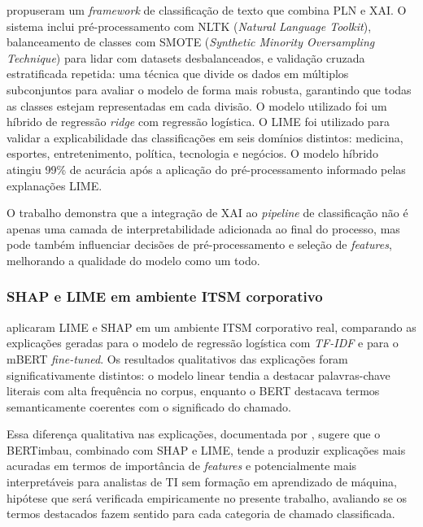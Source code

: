 \documentclass[
    12pt,                %
    openright,           %
    oneside,             %
    a4paper,             %
    english,             %
    brazil               %
]{abntex2}
\begin{document}
 propuseram um \textit{framework} de 
classificação de texto que combina PLN e XAI. O sistema inclui 
pré-processamento com NLTK (\textit{Natural Language Toolkit}), 
balanceamento de classes com SMOTE (\textit{Synthetic Minority 
Oversampling Technique}) para lidar com datasets desbalanceados, 
e validação cruzada estratificada repetida: uma técnica que divide 
os dados em múltiplos subconjuntos para avaliar o modelo de forma 
mais robusta, garantindo que todas as classes estejam representadas 
em cada divisão. O modelo utilizado foi um híbrido de regressão 
\textit{ridge} com regressão logística. O LIME foi utilizado para 
validar a explicabilidade das classificações em seis domínios 
distintos: medicina, esportes, entretenimento, política, tecnologia 
e negócios. O modelo híbrido atingiu 99\% de acurácia após a 
aplicação do pré-processamento informado pelas explanações LIME.

O trabalho demonstra que a integração de XAI ao \textit{pipeline} 
de classificação não é apenas uma camada de interpretabilidade 
adicionada ao final do processo, mas pode também influenciar 
decisões de pré-processamento e seleção de \textit{features}, 
melhorando a qualidade do modelo como um todo.

\subsubsection{SHAP e LIME em ambiente ITSM corporativo}
\label{subsubsec:xai_razma}

 aplicaram LIME e SHAP em um ambiente ITSM corporativo real, comparando as explicações geradas para o modelo de regressão logística com \textit{TF-IDF} e para o mBERT \textit{fine-tuned}. Os resultados qualitativos das explicações foram significativamente distintos: o modelo linear tendia a destacar palavras-chave literais com alta frequência no corpus, enquanto o BERT destacava termos semanticamente coerentes com o significado do chamado.

Essa diferença qualitativa nas explicações, documentada por 
, sugere que o BERTimbau, combinado com SHAP 
e LIME, tende a produzir explicações mais acuradas em termos de 
importância de \textit{features} e potencialmente mais interpretáveis 
para analistas de TI sem formação em aprendizado de máquina, hipótese que será verificada empiricamente no presente trabalho, 
avaliando se os termos destacados fazem sentido para cada categoria 
de chamado classificada.
\end{document}
